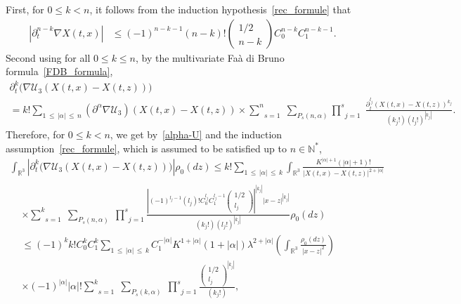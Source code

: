 \documentclass[10pt]{amsart}
\theoremstyle{definition}\newtheorem{defi}[theo]{Definition}\newtheorem{rema}[theo]{Remark}\newtheorem{exam}[theo]{Example}\newtheorem{exem}[theo]{Example}\newtheorem{nota}[theo]{Notation}
\newcommand{\R}{\mathbb{R}}
\newcommand{\N}{\mathbb{N}}
\newcommand{\clU}{\mathcal{U}}
\renewcommand{\leq}{\leqslant}
\begin{document}
First, for $0 \leq k<n$, it follows from the induction hypothesis~\eqref{rec_formule} that
\begin{align}\label{formule_reccurence_gradX}
\left| \partial_t^{n-k}\nabla X(t,x) \right|&\leq (-1)^{n-k-1}(n-k)!
\begin{pmatrix}
1/2 \\ n-k
\end{pmatrix} C_0^{n-k} C_1^{n-k-1}.
\end{align}
Second using for all $0 \leq k\leq n$, by the multivariate Faà di Bruno formula~\eqref{FDB_formula},
\begin{multline*}
\partial_t^k \big(\nabla \clU_3(X(t,x)-X(t,z))\big)\\
=k! \underset{1\,\leq\,|\alpha|\,\leq\,n}{\sum} \left(\partial^\alpha \nabla \clU_3 \right)(X(t,x)-X(t,z))
\times \underset{s=1}{\overset{n}{\sum}}\;\underset{P_s(n,\alpha)}{\sum}\underset{j=1}{\overset{s}{\prod}}\;\frac{\partial_t^{l_j} (X(t,x)-X(t,z))^{k_j}}{\left(k_j!\right) \left(l_j!\right)^{|k_j|}}.
\end{multline*}
Therefore, for $0 \leq k <n$, we get by~\eqref{alpha-U} and the induction assumption~\eqref{rec_formule}, which is assumed to be satisfied up to $n \in \N^*$,
\begin{multline*}
\int_{\R^3} \left|\partial_t^k \big(\nabla \clU_3(X(t,x)-X(t,z))\big) \right| \rho_0(dz) \leq k! \underset{1\,\leq\,|\alpha|\,\leq\,k}{\sum} \int_{\R^3} \frac{K^{|\alpha|+1}(|\alpha|+1)!}{|X(t,x)-X(t,z)|^{2+|\alpha|} }\\
\begin{aligned}
&\times \underset{s=1}{\overset{k}{\sum}}\;\underset{P_s(n,\alpha)}{\sum}\;\underset{j=1}{\overset{s}{\prod}}\frac{\left| (-1)^{l_j-1}(l_j)!C_0^{l_j}C_1^{l_j-1}
\begin{pmatrix}
1/2\\ l_j
\end{pmatrix}\right|^{\left|k_j\right|} |x-z|^{\left|k_j\right|}}{\left(k_j!\right) \left(l_j!\right)^{\left|k_j\right|}}\rho_0(dz)\\
& \leq (-1)^{k} k!C_0^kC_1^k\underset{1\,\leq\,|\alpha|\,\leq\,k}{\sum} C_1^{-|\alpha|}K^{1+|\alpha|}(1+|\alpha|)\lambda^{2+|\alpha|} \left(\int_{\R^3}\frac{\rho_0(dz)}{|x-z|^2} \right) \\
& \times (-1)^{|\alpha|}|\alpha|!\underset{s=1}{\overset{k}{\sum}}\;\underset{P_s(k,\alpha)}{\sum}\;\underset{j=1}{\overset{s}{\prod}}\frac{
\begin{pmatrix}1/2\\ l_j
\end{pmatrix}^{\left|k_j\right|}}{\left(k_j!\right)},
\end{aligned}
 \end{multline*}
\end{document}
